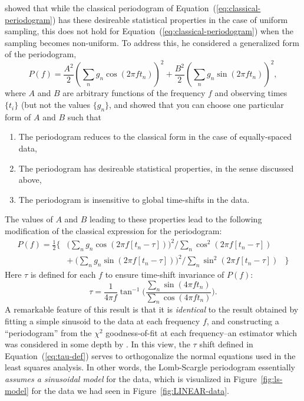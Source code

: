 \documentclass[preprint]{aastex}
\newcommand{\fig}[1]{Figure~\ref{fig:#1}}
\newcommand{\Eq}[1]{Equation~(\ref{eq:#1})}
\newcommand{\eq}[1]{\Eq{#1}}
\newcommand{\eqlabel}[1]{\label{eq:#1}}
\begin{document}
\citet{Scargle82} showed that while the classical periodogram of
\eq{classical-periodogram} has these desireable statistical properties
in the case of uniform sampling, this does not hold for
\eq{classical-periodogram} when the sampling becomes non-uniform.
To address this, he considered a generalized form of the periodogram,
\begin{equation}
  P(f) = \frac{A^2}{2}\left(\sum_n g_n \cos(2\pi f t_n)\right)^2
       + \frac{B^2}{2} \left(\sum_n g_n \sin(2\pi f t_n)\right)^2,
\end{equation}
where $A$ and $B$ are arbitrary functions of the frequency $f$ and
observing times $\{t_i\}$ (but not the values $\{g_n\}$, and showed
that you can choose one particular form of $A$ and $B$ such that
\begin{enumerate}
  \item The periodogram reduces to the classical form in the case of equally-spaced data,
  \item The periodogram has desireable statistical properties, in the sense discussed above,
  \item The periodogram is insensitive to global time-shifts in the data.
\end{enumerate}
The values of $A$ and $B$ leading to these properties lead to the following
modification of the classical expression for the periodogram:
\begin{eqnarray}
  P(f) =
  \frac{1}{2} \Bigg\{ &
  \bigg(\sum_n g_n \cos(2\pi f [t_n-\tau])\bigg)^2 \bigg/
  \sum_n \cos^2(2\pi f [t_n-\tau]) &\nonumber\\
  & + ~ \bigg(\sum_n g_n \sin(2\pi f [t_n-\tau])\bigg)^2 \bigg/
  \sum_n \sin^2(2\pi f [t_n-\tau]) & \Bigg\}
  \eqlabel{lomb-scargle-periodogram}
\end{eqnarray}
Here $\tau$ is defined for each $f$ to ensure time-shift invariance of $P(f)$:
\begin{equation}
  \tau = \frac{1}{4\pi f}\tan^{-1}\Bigg(
  \frac{\sum_n \sin(4\pi f t_n)}{\sum_n \cos(4\pi f t_n)}\Bigg).
  \eqlabel{tau-def}
\end{equation}
A remarkable feature of this result is that it is {\it identical} to the result
obtained by fitting a simple sinusoid to the data at each frequency $f$, and
constructing a ``periodogram'' from the $\chi^2$ goodness-of-fit at each
frequency--an estimator which was considered in some depth by \citet{Lomb76}.
In this view, the $\tau$ shift defined in \eq{tau-def} serves to orthogonalize
the normal equations used in the least squares analysis.
In other words, the Lomb-Scargle periodogram essentially {\it assumes a
sinusoidal model} for the data, which is visualized in \fig{ls-model} for
the data we had seen in \fig{LINEAR-data}.
\end{document}
